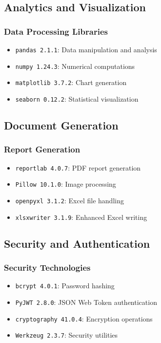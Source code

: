 \documentclass[12pt,a4paper]{article}
\begin{document}
\subsection{Analytics and Visualization}

\subsubsection{Data Processing Libraries}

\begin{itemize}[leftmargin=*]
    \item \texttt{pandas 2.1.1}: Data manipulation and analysis
    \item \texttt{numpy 1.24.3}: Numerical computations
    \item \texttt{matplotlib 3.7.2}: Chart generation
    \item \texttt{seaborn 0.12.2}: Statistical visualization
\end{itemize}

\subsection{Document Generation}

\subsubsection{Report Generation}

\begin{itemize}[leftmargin=*]
    \item \texttt{reportlab 4.0.7}: PDF report generation
    \item \texttt{Pillow 10.1.0}: Image processing
    \item \texttt{openpyxl 3.1.2}: Excel file handling
    \item \texttt{xlsxwriter 3.1.9}: Enhanced Excel writing
\end{itemize}

\subsection{Security and Authentication}

\subsubsection{Security Technologies}

\begin{itemize}[leftmargin=*]
    \item \texttt{bcrypt 4.0.1}: Password hashing
    \item \texttt{PyJWT 2.8.0}: JSON Web Token authentication
    \item \texttt{cryptography 41.0.4}: Encryption operations
    \item \texttt{Werkzeug 2.3.7}: Security utilities
\end{itemize}
\end{document}
